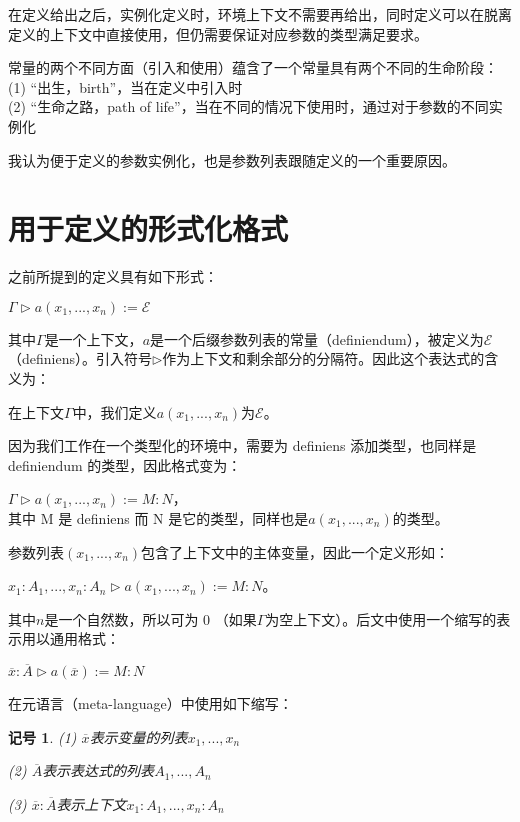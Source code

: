 \documentclass[UTF8]{article}
\newtheorem{notation}[thm]{记号}
\begin{document}
		在定义给出之后，实例化定义时，环境上下文不需要再给出，同时定义可以在脱离定义的上下文中直接使用，但仍需要保证对应参数的类型满足要求。
		
		常量的两个不同方面（引入和使用）蕴含了一个常量具有两个不同的生命阶段：\\
		(1) “出生，birth”，当在定义中引入时\\
		(2) “生命之路，path of life”，当在不同的情况下使用时，通过对于参数的不同实例化
		
		我认为便于定义的参数实例化，也是参数列表跟随定义的一个重要原因。
		
	\section{用于定义的形式化格式}
	\noindent
	之前所提到的定义具有如下形式：
	
		$\Gamma\triangleright a(x_1,...,x_n):=\mathcal{E}$
		
		其中$\Gamma$是一个上下文，$a$是一个后缀参数列表的常量（definiendum），被定义为$\mathcal{E}$（definiens）。引入符号$\triangleright$作为上下文和剩余部分的分隔符。因此这个表达式的含义为：
		
		在上下文$\Gamma$中，我们定义$a(x_1,...,x_n)$为$\mathcal{E}$。
		
		因为我们工作在一个类型化的环境中，需要为 definiens 添加类型，也同样是 definiendum 的类型，因此格式变为：
		
		$\Gamma\triangleright a(x_1,...,x_n):=M:N$，\\
		其中 M 是 definiens 而 N 是它的类型，同样也是$a(x_1,...,x_n)$的类型。
		
		参数列表$(x_1,...,x_n)$包含了上下文中的主体变量，因此一个定义形如：
		
		$x_1:A_1,...,x_n:A_n\triangleright a(x_1,...,x_n):=M:N$。
		
		其中$n$是一个自然数，所以可为 0 （如果$\Gamma$为空上下文）。后文中使用一个缩写的表示用以通用格式：
		
		$\overline{x}:\overline{A}\triangleright a(\overline{x}):=M:N$
		
		在元语言（meta-language）中使用如下缩写：
		
		\begin{notation}(1) $\overline{x}$表示变量的列表$x_1,...,x_n$
			
			(2) $\overline{A}$表示表达式的列表$A_1,...,A_n$
			
			(3) $\overline{x}:\overline{A}$表示上下文$x_1:A_1,...,x_n:A_n$
		\end{notation}
\end{document}
